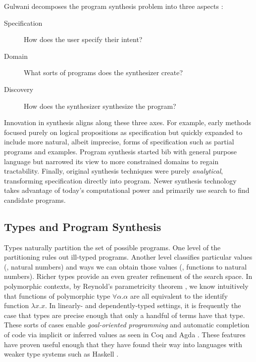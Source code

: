 Gulwani decomposes the program synthesis problem into three aspects
\cite{gulwani-ppdp-2010}:

\begin{description}
  \item[Specification] How does the user specify their intent?
  \item[Domain] What sorts of programs does the synthesizer create?
  \item[Discovery] How does the synthesizer synthesize the program?
\end{description}

Innovation in synthesis aligns along these three axes.  For example, early
methods focused purely on logical propositions as specification but quickly
expanded to include more natural, albeit imprecise, forms of specification such
as partial programs and examples.  Program synthesis started bib with general
purpose language but narrowed its view to more constrained domains to regain
tractability.  Finally, original synthesis techniques were purely
\emph{analytical}, transforming specification directly into program.  Newer
synthesis technology takes advantage of today's computational power and
primarily use search to find candidate programs.

\subsection{Types and Program Synthesis}

Types naturally partition the set of possible programs.  One level of the
partitioning rules out ill-typed programs.  Another level classifies particular
values (\eg, natural numbers) and ways we can obtain those values (\eg,
functions to natural numbers).  Richer types provide an even greater refinement
of the search space.  In polymorphic contexts, by Reynold's parametricity
theorem \cite{wadler-fpca-1989}, we know intuitively that functions of
polymorphic type $\forall \alpha. \alpha$ are all equivalent to the identify
function $\lambda x.  x$.  In linearly- and dependently-typed settings, it is
frequently the case that types are precise enough that only a handful of terms
have that type.  These sorts of cases enable \emph{goal-oriented programming}
and automatic completion of code via implicit or inferred values
\cite{oliveira-pldi-2012} as seen in Coq \cite{coq-2012} and Agda
\cite{mcbride-icfp-2012}.  These features have proven useful enough that they
have found their way into languages with weaker type systems such as Haskell
\cite{ghc-typed-holes}.

